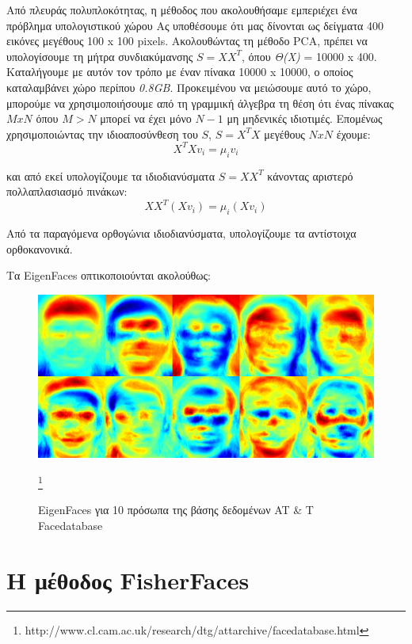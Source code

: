 Από πλευράς πολυπλοκότητας, η μέθοδος που ακολουθήσαμε εμπεριέχει ένα πρόβλημα
υπολογιστικού χώρου Ας υποθέσουμε ότι μας δίνονται ως δείγματα 400 εικόνες
μεγέθους 100 x 100 pixels. Ακολουθώντας τη μέθοδο PCA, πρέπει να υπολογίσουμε
τη μήτρα συνδιακύμανσης $ S = XX^T $, όπου \emph{Θ(X)} = 10000 x 400. Καταλήγουμε
με αυτόν τον τρόπο με έναν πίνακα 10000 x 10000, ο οποίος καταλαμβάνει χώρο περίπου
\emph{0.8GB}.
Προκειμένου να μειώσουμε αυτό το χώρο, μπορούμε να χρησιμοποιήσουμε από τη γραμμική
άλγεβρα τη θέση ότι ένας πίνακας $M x N$ όπου $Μ > Ν$ μπορεί να έχει μόνο $N-1$
μη μηδενικές ιδιοτιμές. Επομένως χρησιμοποιώντας την ιδιοαποσύνθεση του $S$, $S=X^TX$
μεγέθους $NxN$ έχουμε:
\begin{equation}
    X^TXv_i = \mu_iv_i
    \tag{6}
    \label{eq:6}
\end{equation}

και από εκεί υπολογίζουμε τα ιδιοδιανύσματα $S = XX^T$ κάνοντας αριστερό πολλαπλασιασμό
πινάκων:
\begin{equation}
    XX^T(Xv_i) = \mu_i(Xv_i)
    \tag{7}
    \label{eq:7}
\end{equation}

Από τα παραγόμενα ορθογώνια ιδιοδιανύσματα, υπολογίζουμε τα αντίστοιχα ορθοκανονικά.

Τα EigenFaces οπτικοποιούνται ακολούθως:



\begin{figure}[htbp]
  \begin{center}
    \includegraphics[width=0.8\maxwidth]{../figures/eigenfaces.png}
      \caption{EigenFaces για 10 πρόσωπα της βάσης δεδομένων AT \& T Facedatabase}\footnote{http://www.cl.cam.ac.uk/research/dtg/attarchive/facedatabase.html}
      \label{fig:eigenfaces}
   \end{center}
\end{figure}


\section{H μέθοδος FisherFaces}\label{sec:fisher}

